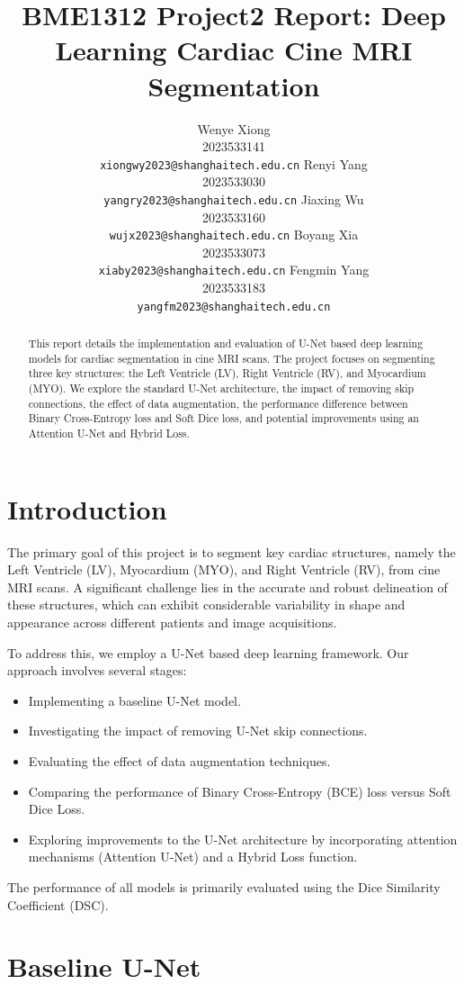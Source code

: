 \documentclass{article}
\title{BME1312 Project2 Report: Deep Learning Cardiac Cine MRI Segmentation}
\author{%
  Wenye Xiong \\
  2023533141 \\
  \texttt{xiongwy2023@shanghaitech.edu.cn}
  \And
  Renyi Yang \\
  2023533030 \\
  \texttt{yangry2023@shanghaitech.edu.cn}
  \AND
  Jiaxing Wu \\
  2023533160 \\
  \texttt{wujx2023@shanghaitech.edu.cn}
  \And
  Boyang Xia \\
  2023533073 \\
  \texttt{xiaby2023@shanghaitech.edu.cn}
  \AND
  Fengmin Yang \\
  2023533183 \\
  \texttt{yangfm2023@shanghaitech.edu.cn}
}
\begin{document}
\maketitle


\begin{abstract}
  This report details the implementation and evaluation of U-Net based deep learning models for cardiac segmentation
  in cine MRI scans. The project focuses on segmenting three key structures: the Left Ventricle (LV), Right Ventricle (RV),
  and Myocardium (MYO). We explore the standard U-Net architecture, the impact of removing skip connections, the effect of
  data augmentation, the performance difference between Binary Cross-Entropy loss and Soft Dice loss, and potential improvements using an Attention U-Net and Hybrid Loss.
\end{abstract}

\section{Introduction}
The primary goal of this project is to segment key cardiac structures, namely the Left Ventricle (LV), Myocardium (MYO), and Right Ventricle (RV), from cine MRI scans. A significant challenge lies in the accurate and robust delineation of these structures, which can exhibit considerable variability in shape and appearance across different patients and image acquisitions.

To address this, we employ a U-Net based deep learning framework. Our approach involves several stages:
\begin{itemize}
  \item Implementing a baseline U-Net model.
  \item Investigating the impact of removing U-Net skip connections.
  \item Evaluating the effect of data augmentation techniques.
  \item Comparing the performance of Binary Cross-Entropy (BCE) loss versus Soft Dice Loss.
  \item Exploring improvements to the U-Net architecture by incorporating attention mechanisms (Attention U-Net) and a Hybrid Loss function.
\end{itemize}
The performance of all models is primarily evaluated using the Dice Similarity Coefficient (DSC).

\section{Baseline U-Net}
\end{document}
